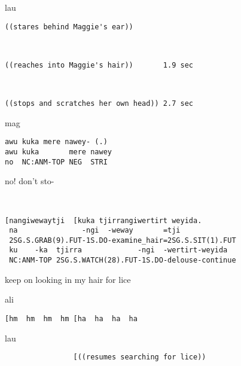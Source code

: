 \documentclass[output=paper,nonflat,colorlinks,citecolor=brown]{langsci/langscibook}
\begin{document}
\vspace{2mm}
%
\begin{transbox}{1}{lau}
\begin{verbatim}
((stares behind Maggie's ear))
\end{verbatim}
\end{transbox}
%
\begin{transbox}{2}{~}
\begin{verbatim}
((reaches into Maggie's hair))       1.9 sec
\end{verbatim}
\end{transbox}
%
\begin{transbox}{3}{~}
\begin{verbatim}
((stops and scratches her own head)) 2.7 sec
\end{verbatim}
\end{transbox}
%
\begin{mdframednoverticalspace}[style=firstfoc]
\begin{transbox}{4}{mag}
\begin{verbatim}
awu kuka mere nawey- (.)
awu kuka       mere nawey
no  NC:ANM-TOP NEG  STRI
\end{verbatim}
no! don't sto-
\end{transbox}
\end{mdframednoverticalspace}
%
\begin{mdframednoverticalspace}[style=firstfoc]
\begin{transbox}{5}{~}
\begin{verbatim}
[nangiwewaytji  [kuka tjirrangiwertirt weyida.
 na               -ngi  -weway       =tji
 2SG.S.GRAB(9).FUT-1S.DO-examine_hair=2SG.S.SIT(1).FUT
 ku    -ka  tjirra             -ngi  -wertirt-weyida
 NC:ANM-TOP 2SG.S.WATCH(28).FUT-1S.DO-delouse-continue
\end{verbatim}
\hspace{0.07cm} keep on looking in my hair for lice
\end{transbox}
\end{mdframednoverticalspace}\vspace{1mm}
%
\begin{transbox}{6}{ali}
\begin{verbatim}
[hm  hm  hm  hm [ha  ha  ha  ha
\end{verbatim}
\end{transbox}
%
\begin{mdframednoverticalspace}[style=secondfoc]
\begin{transbox}{7}{lau}
\begin{verbatim}
                [((resumes searching for lice))
\end{verbatim}
\end{transbox}
\end{mdframednoverticalspace}
\end{document}
